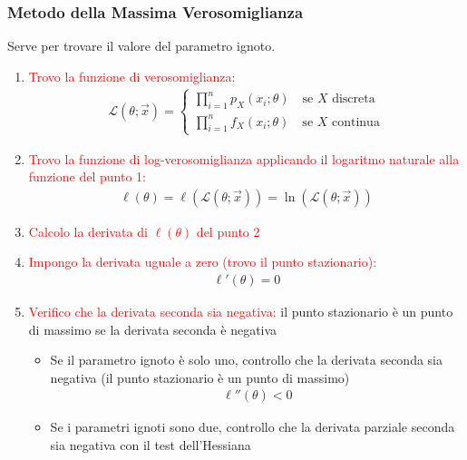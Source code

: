 \documentclass{article}  %
\theoremstyle{definition}
\begin{document}
\subsubsection{Metodo della Massima Verosomiglianza}
Serve per trovare il valore del parametro ignoto.
\begin{enumerate}
	\item \textcolor{red}{Trovo la funzione di verosomiglianza:}
	      \begin{align*}
		      \mathscr{L}(\theta; \vec{x}) = \begin{cases}
			                                     \prod_{i=1}^{n}p_X(x_i;\theta) \quad \text{se } X \text{ discreta} \\
			                                     \prod_{i=1}^{n}f_X(x_i;\theta) \quad \text{se } X \text{ continua}
		                                     \end{cases}
	      \end{align*}
	\item \textcolor{red}{Trovo la funzione di log-verosomiglianza applicando il logaritmo naturale alla funzione del punto 1:}
	      \begin{align*}
		      \ell(\theta) = \ell(\mathscr{L}(\theta; \vec{x})) =\ln(\mathscr{L}(\theta; \vec{x}))
	      \end{align*}
	\item \textcolor{red}{Calcolo la derivata di $\ell(\theta)$ del punto 2}
	\item \textcolor{red}{Impongo la derivata uguale a zero (trovo il punto stazionario):}
	      \begin{align*}
		      \ell'(\theta)=0
	      \end{align*}
	\item \textcolor{red}{Verifico che la derivata seconda sia negativa:}
	      il punto stazionario è un punto di massimo se la derivata seconda è negativa
	      \begin{itemize}
		      \item Se il parametro ignoto è solo uno, controllo che la derivata seconda sia negativa (il punto stazionario è un punto di massimo)
		            \begin{align*}
			            \ell''(\theta)<0
		            \end{align*}
		      \item Se i parametri ignoti sono due, controllo che la derivata parziale seconda sia negativa con il test dell'Hessiana
	      \end{itemize}
\end{enumerate}
\end{document}
